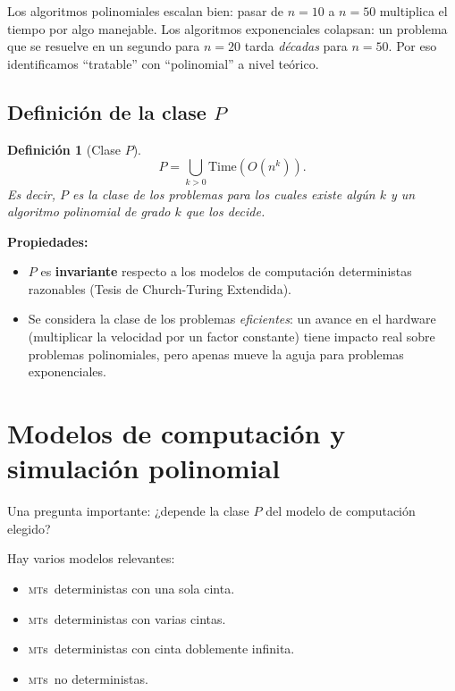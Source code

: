 \documentclass[11pt,a4paper]{article}
\theoremstyle{definicion}
\newtheorem{definicion}{Definición}[section]
\newcommand{\MTs}{\textsc{mt}s}
\begin{document}
\begin{intuicion}
Los algoritmos polinomiales escalan bien: pasar de $n = 10$ a $n = 50$ multiplica el tiempo por algo manejable. Los algoritmos exponenciales colapsan: un problema que se resuelve en un segundo para $n = 20$ tarda \emph{décadas} para $n = 50$. Por eso identificamos ``tratable'' con ``polinomial'' a nivel teórico.
\end{intuicion}

\subsection{Definición de la clase $P$}

\begin{definicion}[Clase $P$]
\[
P = \bigcup_{k > 0} \mathrm{Time}(O(n^k)).
\]
Es decir, $P$ es la clase de los problemas para los cuales \emph{existe algún $k$} y un algoritmo polinomial de grado $k$ que los decide.
\end{definicion}

\textbf{Propiedades:}
\begin{itemize}
    \item $P$ es \textbf{invariante} respecto a los modelos de computación deterministas razonables (Tesis de Church-Turing Extendida).
    \item Se considera la clase de los problemas \emph{eficientes}: un avance en el hardware (multiplicar la velocidad por un factor constante) tiene impacto real sobre problemas polinomiales, pero apenas mueve la aguja para problemas exponenciales.
\end{itemize}

\section{Modelos de computación y simulación polinomial}

Una pregunta importante: ¿depende la clase $P$ del modelo de computación elegido?

Hay varios modelos relevantes:
\begin{itemize}
    \item \MTs\ deterministas con una sola cinta.
    \item \MTs\ deterministas con varias cintas.
    \item \MTs\ deterministas con cinta doblemente infinita.
    \item \MTs\ no deterministas.
\end{itemize}
\end{document}
